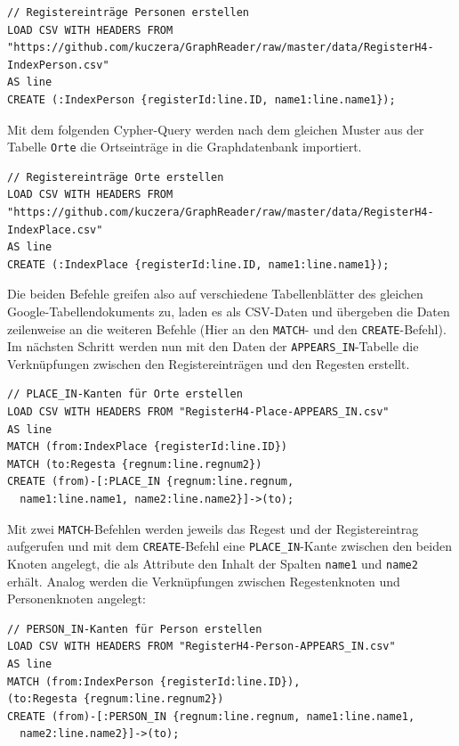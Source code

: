 \documentclass[ngerman,]{scrreprt}
\begin{document}
\begin{verbatim}
// Registereinträge Personen erstellen
LOAD CSV WITH HEADERS FROM "https://github.com/kuczera/GraphReader/raw/master/data/RegisterH4-IndexPerson.csv"
AS line
CREATE (:IndexPerson {registerId:line.ID, name1:line.name1});
\end{verbatim}

Mit dem folgenden Cypher-Query werden nach dem gleichen Muster aus der Tabelle \texttt{Orte} die Ortseinträge in die Graphdatenbank importiert.

\begin{verbatim}
// Registereinträge Orte erstellen
LOAD CSV WITH HEADERS FROM "https://github.com/kuczera/GraphReader/raw/master/data/RegisterH4-IndexPlace.csv"
AS line
CREATE (:IndexPlace {registerId:line.ID, name1:line.name1});
\end{verbatim}

Die beiden Befehle greifen also auf verschiedene Tabellenblätter des gleichen Google-Tabellendokuments zu, laden es als CSV-Daten und übergeben die Daten zeilenweise an die weiteren Befehle (Hier an den \texttt{MATCH}- und den \texttt{CREATE}-Befehl). Im nächsten Schritt werden nun mit den Daten der \texttt{APPEARS\_IN}-Tabelle die Verknüpfungen zwischen den Registereinträgen und den Regesten erstellt.

\begin{verbatim}
// PLACE_IN-Kanten für Orte erstellen
LOAD CSV WITH HEADERS FROM "RegisterH4-Place-APPEARS_IN.csv"
AS line
MATCH (from:IndexPlace {registerId:line.ID})
MATCH (to:Regesta {regnum:line.regnum2})
CREATE (from)-[:PLACE_IN {regnum:line.regnum,
  name1:line.name1, name2:line.name2}]->(to);
\end{verbatim}

Mit zwei \texttt{MATCH}-Befehlen werden jeweils das Regest und der Registereintrag aufgerufen und mit dem \texttt{CREATE}-Befehl eine \texttt{PLACE\_IN}-Kante zwischen den beiden Knoten angelegt, die als Attribute den Inhalt der Spalten \texttt{name1} und \texttt{name2} erhält. Analog werden die Verknüpfungen zwischen Regestenknoten und Personenknoten angelegt:

\begin{verbatim}
// PERSON_IN-Kanten für Person erstellen
LOAD CSV WITH HEADERS FROM "RegisterH4-Person-APPEARS_IN.csv"
AS line
MATCH (from:IndexPerson {registerId:line.ID}),
(to:Regesta {regnum:line.regnum2})
CREATE (from)-[:PERSON_IN {regnum:line.regnum, name1:line.name1,
  name2:line.name2}]->(to);
\end{verbatim}
\end{document}
